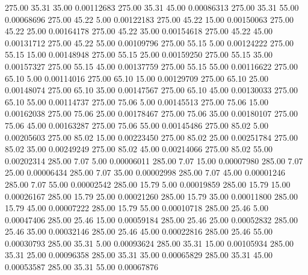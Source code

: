     275.00     35.31     35.00     0.00112683
    275.00     35.31     45.00     0.00086313
    275.00     35.31     55.00     0.00068696
    275.00     45.22      5.00     0.00122183
    275.00     45.22     15.00     0.00150063
    275.00     45.22     25.00     0.00164178
    275.00     45.22     35.00     0.00154618
    275.00     45.22     45.00     0.00131712
    275.00     45.22     55.00     0.00109796
    275.00     55.15      5.00     0.00124222
    275.00     55.15     15.00     0.00148948
    275.00     55.15     25.00     0.00159250
    275.00     55.15     35.00     0.00157327
    275.00     55.15     45.00     0.00137759
    275.00     55.15     55.00     0.00116622
    275.00     65.10      5.00     0.00114016
    275.00     65.10     15.00     0.00129709
    275.00     65.10     25.00     0.00148074
    275.00     65.10     35.00     0.00147567
    275.00     65.10     45.00     0.00130033
    275.00     65.10     55.00     0.00114737
    275.00     75.06      5.00     0.00145513
    275.00     75.06     15.00     0.00162038
    275.00     75.06     25.00     0.00178467
    275.00     75.06     35.00     0.00180107
    275.00     75.06     45.00     0.00163287
    275.00     75.06     55.00     0.00145486
    275.00     85.02      5.00     0.00205603
    275.00     85.02     15.00     0.00223450
    275.00     85.02     25.00     0.00251784
    275.00     85.02     35.00     0.00249249
    275.00     85.02     45.00     0.00214066
    275.00     85.02     55.00     0.00202314
    285.00      7.07      5.00     0.00006011
    285.00      7.07     15.00     0.00007980
    285.00      7.07     25.00     0.00006434
    285.00      7.07     35.00     0.00002998
    285.00      7.07     45.00     0.00001246
    285.00      7.07     55.00     0.00002542
    285.00     15.79      5.00     0.00019859
    285.00     15.79     15.00     0.00026167
    285.00     15.79     25.00     0.00021260
    285.00     15.79     35.00     0.00011800
    285.00     15.79     45.00     0.00007222
    285.00     15.79     55.00     0.00010718
    285.00     25.46      5.00     0.00047406
    285.00     25.46     15.00     0.00059184
    285.00     25.46     25.00     0.00052832
    285.00     25.46     35.00     0.00032146
    285.00     25.46     45.00     0.00022816
    285.00     25.46     55.00     0.00030793
    285.00     35.31      5.00     0.00093624
    285.00     35.31     15.00     0.00105934
    285.00     35.31     25.00     0.00096358
    285.00     35.31     35.00     0.00065829
    285.00     35.31     45.00     0.00053587
    285.00     35.31     55.00     0.00067876

